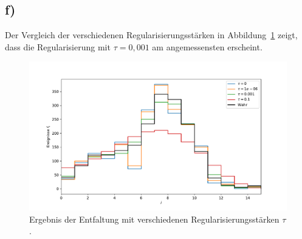 \documentclass[a4paper, 11pt]{article}
\begin{document}
\subsection*{f)}
Der Vergleich der verschiedenen Regularisierungsstärken in Abbildung~\ref{fig:38f} zeigt, dass die Regularisierung mit $\tau = 0,001$ am angemessensten erscheint.
\begin{figure}[H]
    \centering
    \includegraphics[width=\textwidth]{../A38/A38f.pdf}
    \caption{Ergebnis der Entfaltung mit verschiedenen Regularisierungsstärken $\tau$.}
    \label{fig:38f}
\end{figure}

\end{document}
